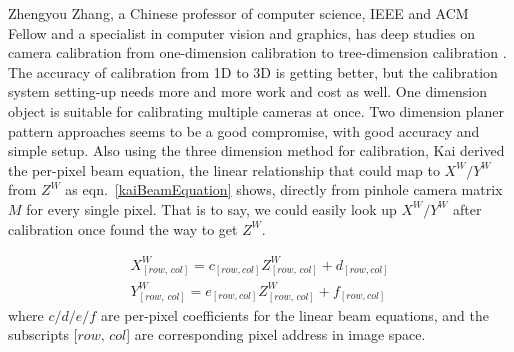 
Zhengyou Zhang, a Chinese professor of computer science, IEEE and ACM Fellow and a specialist in computer vision and graphics, has deep studies on camera calibration from one-dimension calibration to tree-dimension calibration \cite{zhangCalibration1_2004} \cite{zhangCalibration2_2000} \cite{Zhengyou04}. The accuracy of calibration from 1D to 3D is getting better, but the calibration system setting-up needs more and more work and cost as well. One dimension object is suitable for calibrating multiple cameras at once. Two dimension planer pattern approaches seems to be a good compromise, with good accuracy and simple setup. Also using the three dimension method for calibration, Kai \cite{Kai10} derived the per-pixel  beam equation, the linear relationship that could map to \(X^W/Y^W\) from \(Z^W\) as eqn.~\ref{kaiBeamEquation} shows, directly from pinhole camera matrix \(M\) for every single pixel. That is to say, we could easily look up \(X^W/Y^W\) after calibration once found the way to get \(Z^W\).

\begin{equation}
\begin{aligned}
X^W_{[row, \, col]} = c_{[row, col]}Z^W_{[row, \, col]}+d_{[row, col]}
\\%
Y^W_{[row, \, col]} = e_{[row, col]}Z^W_{[row, \, col]}+f_{[row, col]}
\end{aligned}
\label{kaiBeamEquation}
\end{equation}%
\noindent
where \(c/d/e/f\) are per-pixel coefficients for the linear beam equations, and the subscripts [\(row, \, col\)] are corresponding pixel address in image space.



